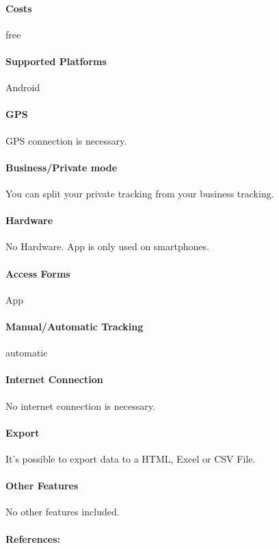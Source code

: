 \paragraph{Costs} free
\paragraph{Supported Platforms} Android 
\paragraph{GPS} GPS connection is necessary.
\paragraph{Business/Private mode} You can split your private tracking from your business tracking.
\paragraph{Hardware} No Hardware. App is only used on smartphones.
\paragraph{Access Forms} App
\paragraph{Manual/Automatic Tracking} automatic
\paragraph{Internet Connection} No internet connection is necessary.
\paragraph{Export} It’s possible to export data to a HTML, Excel or CSV File.
\paragraph{Other Features} No other features included.
\paragraph{References:} \cite{Mileage_Logbook}
\newpage

